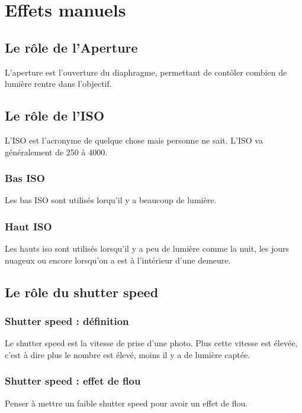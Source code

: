 \documentclass{article}
\begin{document}
\maketitle

\section{Effets manuels}
\subsection{Le rôle de l'Aperture}
L'aperture est l'ouverture du diaphragme, permettant de contôler combien de lumière rentre dans l'objectif.

\subsection{Le rôle de l'ISO}
L'ISO est l'acronyme de quelque chose mais personne ne sait. L'ISO va généralement de 250 à 4000.

\subsubsection{Bas ISO}
Les bas ISO sont utilisés lorqu'il y a beaucoup de lumière.

\subsubsection{Haut ISO}
Les hauts iso sont utilisés lorsqu'il y a peu de lumière comme la nuit, les jours nuageux ou encore lorsqu'on a est à l'intérieur d'une demeure.

\subsection{Le rôle du shutter speed}

\subsubsection{Shutter speed : définition}

Le shutter speed est la vitesse de prise d'une photo. Plus cette vitesse est élevée, c'est à dire plus le nombre est élevé, moins il y a de lumière captée.

\subsubsection{Shutter speed : effet de flou}
Penser à mettre un faible shutter speed pour avoir un effet de flou.
\end{document}
